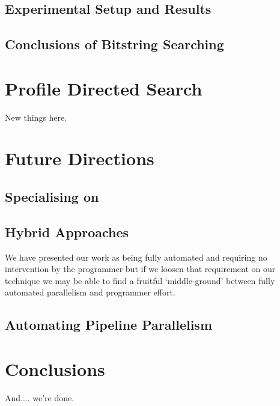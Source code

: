 \documentclass[justified, twoside, a4paper, symmetric]{tufte-book}
\begin{document}
    \section{Experimental Setup and Results}
    \label{sec:blind-Results}
    

    \section{Conclusions of Bitstring Searching}
    \label{sec:blind-Conclusion}
    

\chapter{Profile Directed Search}

    New things here.
    \label{sec:informed-search}
    


\chapter{Future Directions}

    \section{Specialising on \underline{\hspace{2cm}}}

    \section{Hybrid Approaches}

        We have presented our work as being fully automated and requiring no
        intervention by the programmer but if we loosen that requirement on
        our technique we may be able to find a fruitful `middle-ground' between
        fully automated parallelism and programmer effort.

    \section{Automating Pipeline Parallelism}


\chapter{Conclusions}

    And.... we're done.

\listoftodos[Notes]

\backmatter



\end{document}
